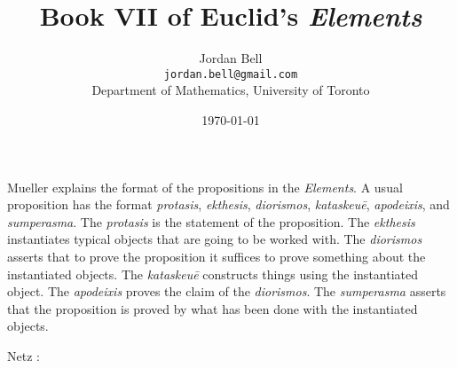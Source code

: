\documentclass{article}
\begin{document}
\title{Book VII of Euclid's {\em Elements}}
\author{Jordan Bell\\ \texttt{jordan.bell@gmail.com}\\Department of Mathematics, University of Toronto}
\date{\today}

\maketitle


Mueller \cite[p.~11]{mueller} explains the format of the propositions in the {\em Elements}.
A usual proposition has
the format 
{\em protasis}, {\em ekthesis}, {\em diorismos}, {\em kataskeu\={e}}, {\em apodeixis}, and {\em sumperasma}.
The {\em protasis} is the statement of the proposition. The {\em ekthesis} instantiates typical objects that are going to be worked with.
The {\em diorismos} asserts that to prove the proposition it suffices to prove something about the instantiated objects.
The {\em kataskeu\={e}} constructs things using the instantiated object. The {\em apodeixis} proves
the claim of the {\em diorismos}. The {\em sumperasma} asserts that the proposition is proved by what has been done with the instantiated objects.

Netz \cite[pp.~268--269]{netz}:
\end{document}
